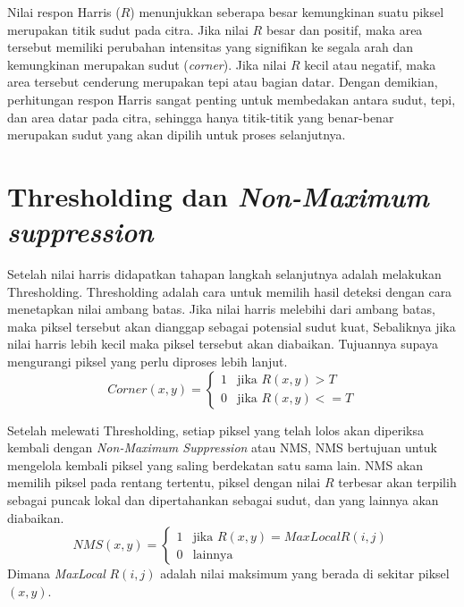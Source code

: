     Nilai respon Harris (\(R\)) menunjukkan seberapa besar kemungkinan suatu piksel merupakan titik sudut pada citra. Jika nilai \(R\) besar dan positif, maka area tersebut memiliki perubahan intensitas yang signifikan ke segala arah dan kemungkinan merupakan sudut (\emph{corner}). Jika nilai \(R\) kecil atau negatif, maka area tersebut cenderung merupakan tepi atau bagian datar. Dengan demikian, perhitungan respon Harris sangat penting untuk membedakan antara sudut, tepi, dan area datar pada citra, sehingga hanya titik-titik yang benar-benar merupakan sudut yang akan dipilih untuk proses selanjutnya.

\section{Thresholding dan \emph{Non-Maximum suppression}}
    Setelah nilai harris didapatkan tahapan langkah selanjutnya adalah melakukan Thresholding.
Thresholding adalah cara untuk memilih hasil deteksi dengan cara menetapkan nilai ambang batas.
Jika nilai harris melebihi dari ambang batas, maka piksel tersebut akan dianggap sebagai potensial sudut kuat, Sebaliknya jika nilai harris lebih kecil maka piksel tersebut akan diabaikan.
Tujuannya supaya mengurangi piksel yang perlu diproses lebih lanjut.
\begin{equation}
    Corner(x,y) = 
    \begin{cases}  
        1 & \text{jika } R(x,y) > T \\ 
        0 & \text{jika } R(x,y) <= T
    \end{cases}
\end{equation}

    Setelah melewati Thresholding, setiap piksel yang telah lolos akan diperiksa kembali dengan \emph{Non-Maximum Suppression} atau NMS,
NMS bertujuan untuk mengelola kembali piksel yang saling berdekatan satu sama lain. NMS akan memilih piksel pada rentang tertentu, piksel dengan nilai \(R\) terbesar akan terpilih sebagai puncak lokal dan dipertahankan sebagai sudut, dan yang lainnya akan diabaikan.
\begin{equation*}
    NMS(x,y) =
    \begin{cases}
        1 & \text{jika } R(x,y) = MaxLocal R(i,j) \\
        0 & \text{lainnya }
    \end{cases}
\end{equation*}
Dimana \emph{MaxLocal} \(R(i,j)\) adalah nilai maksimum yang berada di sekitar piksel \((x,y)\).

